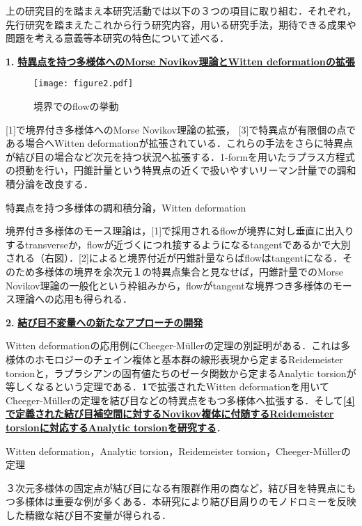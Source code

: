 \documentclass[11pt,a4j,dvipdfmx]{jarticle} 					%
\newcommand{\研究課題名}{象の卵}
\newcommand{\研究機関名}{京都大学}
\newcommand{\研究代表者氏名}{福士　謙二　　　}
\begin{document}
\noindent
{}

上の研究目的を踏まえ本研究活動では以下の３つの項目に取り組む．それぞれ，先行研究を踏まえたこれから行う研究内容，用いる研究手法，期待できる成果や問題を考える意義等本研究の特色について述べる．


\begin{screen}
\textbf{1. }\textbf{\ul{特異点を持つ多様体へのMorse Novikov理論とWitten deformationの拡張}}

\begin{wrapfigure}[8]{r}[0mm]{12zw}
    \vspace*{-\intextsep} %
	\texttt{[image: figure2.pdf]}
	\caption{境界でのflowの挙動}
\end{wrapfigure}

 [1]で境界付き多様体へのMorse Novikov理論の拡張，
 [3]で特異点が有限個の点である場合へWitten deformationが拡張されている．これらの手法をさらに特異点が結び目の場合など次元を持つ状況へ拡張する．1-formを用いたラプラス方程式の摂動を行い，円錐計量という特異点の近くで扱いやすいリーマン計量での調和積分論を改良する．


 特異点を持つ多様体の調和積分論，Witten deformation

 境界付き多様体のモース理論は，[1]で採用されるflowが境界に対し垂直に出入りするtransverseか，flowが近づくにつれ接するようになるtangentであるかで大別される（右図）．[2]によると境界付近が円錐計量ならばflowはtangentになる．そのため多様体の境界を余次元１の特異点集合と見なせば，円錐計量でのMorse Novikov理論の一般化という枠組みから，flowがtangentな境界つき多様体のモース理論への応用も得られる．

\end{screen}

\noindent
\begin{screen}
\textbf{2. } \textbf{\ul{結び目不変量への新たなアプローチの開発}}

Witten deformationの応用例にCheeger-M\"{u}llerの定理の別証明がある．これは多様体のホモロジーのチェイン複体と基本群の線形表現から定まるReidemeister torsionと，ラプラシアンの固有値たちのゼータ関数から定まるAnalytic torsionが等しくなるという定理である．\textbf{1}で拡張されたWitten deformationを用いてCheeger-M\"{u}llerの定理を結び目などの特異点をもつ多様体へ拡張する．そして\textbf{\ul{[4]で定義された結び目補空間に対するNovikov複体に付随するReidemeister torsionに対応するAnalytic torsionを研究する}}．

Witten deformation，Analytic torsion，Reidemeister torsion，Cheeger-M\"{u}llerの定理

３次元多様体の固定点が結び目になる有限群作用の商など，結び目を特異点にもつ多様体は重要な例が多くある．本研究により結び目周りのモノドロミーを反映した精緻な結び目不変量が得られる．




\end{screen}
\end{document}
